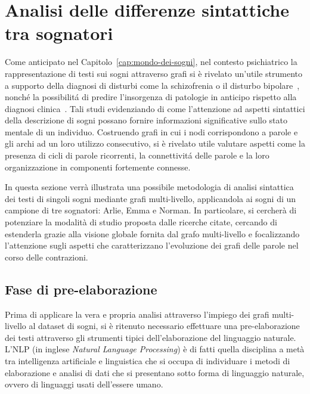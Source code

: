 \section{Analisi delle differenze sintattiche tra sognatori} \label{sec:analisi-delle-differenze-sintattiche-tra-sognatori}

Come anticipato nel Capitolo~\ref{cap:mondo-dei-sogni}, nel contesto psichiatrico la rappresentazione di testi sui
sogni attraverso grafi si \`e rivelato un'utile strumento a supporto della diagnosi di disturbi come la schizofrenia
o il disturbo bipolare~\cite{mota2014graph}, nonch\'e la possibilit\'a di predire l'insorgenza di patologie in
anticipo rispetto alla diagnosi clinica~\cite{mota2017thought}.
Tali studi evidenziando di come l'attenzione ad aspetti sintattici della descrizione di sogni possano fornire
informazioni significative sullo stato mentale di un individuo. Costruendo grafi in cui i nodi corrispondono a parole
e gli archi ad un loro utilizzo consecutivo, si è rivelato utile valutare aspetti come la presenza di cicli di parole
ricorrenti, la connettivit\'a delle parole e la loro organizzazione in componenti fortemente connesse.

In questa sezione verrà illustrata una possibile metodologia di analisi sintattica dei testi di singoli sogni mediante
grafi multi-livello, applicandola ai sogni di un campione di tre sognatori: Arlie, Emma e Norman.
In particolare, si cercherà di potenziare la modalità di studio proposta dalle ricerche citate, cercando di estenderla
grazie alla visione globale fornita dal grafo multi-livello e focalizzando l'attenzione sugli aspetti che caratterizzano
l'evoluzione dei grafi delle parole nel corso delle contrazioni.

\subsection{Fase di pre-elaborazione}\label{subec:pre-elaborazione-con-NLP}
Prima di applicare la vera e propria analisi attraverso l'impiego dei grafi multi-livello al dataset di sogni, si è
ritenuto necessario effettuare una pre-elaborazione dei testi attraverso gli strumenti tipici dell'elaborazione del
linguaggio naturale.
L'NLP (in inglese \textit{Natural Language Processing}) è di fatti quella disciplina a metà tra intelligenza artificiale
e linguistica che si occupa di individuare i metodi di elaborazione e analisi di dati che si presentano sotto forma di
linguaggio naturale, ovvero di linguaggi usati dell'essere umano. \newline

